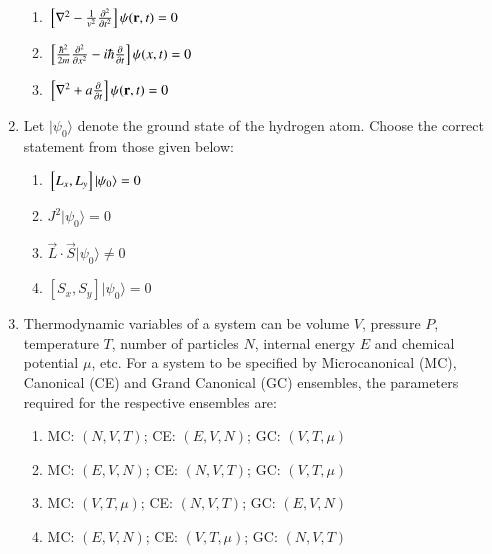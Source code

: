 \documentclass[journal,12pt,onecolumn]{IEEEtran}
\theoremstyle{remark}
\begin{document}
\begin{enumerate}
\begin{multicols}{2}
\begin{enumerate}
        \item $ {}\left[\nabla^2 - \frac{1}{v^2} \frac{\partial^2}{\partial t^2}\right]  \psi(\mathbf{r},t) = 0$
        
        \item ${}\left[\frac{\hbar^2}{2m} \frac{\partial^2}{\partial x^2} - i\hbar \frac{\partial}{\partial t}\right] \psi(x,t) = 0$
        
        \item $ {}\left[\nabla^2 + a \frac{\partial}{\partial t}\right]  \psi(\mathbf{r},t) = 0$
    \end{enumerate}
\end{multicols}

\item Let $| \psi_0 \rangle$ denote the ground state of the hydrogen atom. Choose the correct statement from those given below:
\hfill{}
\begin{multicols}{2}
    \begin{enumerate}
        \item ${}\left[ L_x, L_y \right] | \psi_0 \rangle = 0$
        \item $J^2 | \psi_0\rangle = 0$
        \item $\vec{L} \cdot \vec{S} | \psi_0 \rangle \neq 0$
        \item $[ S_x, S_y ] | \psi_0 \rangle = 0$
    \end{enumerate}
\end{multicols}

\item Thermodynamic variables of a system can be volume $V$, pressure $P$, temperature $T$, number of particles $N$, internal energy $E$ and chemical potential $\mu$, etc. For a system to be specified by Microcanonical (MC), Canonical (CE) and Grand Canonical (GC) ensembles, the parameters required for the respective ensembles are:

\hfill{}
\begin{multicols}{2}
    \begin{enumerate}
        \item MC: $(N,V,T)$; CE: $(E,V,N)$; GC: $(V,T,\mu)$
        \item MC: $(E,V,N)$; CE: $(N,V,T)$; GC: $(V,T,\mu)$
        \item MC: $(V,T,\mu)$; CE: $(N,V,T)$; GC: $(E,V,N)$
        \item MC: $(E,V,N)$; CE: $(V,T,\mu)$; GC: $(N,V,T)$
    \end{enumerate}
\end{multicols}


\end{enumerate}
\end{document}
